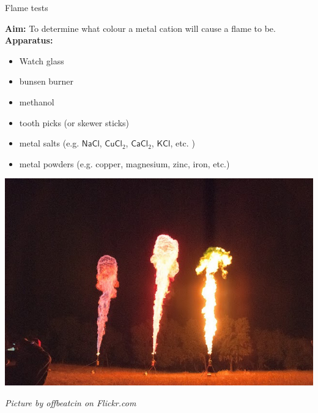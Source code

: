 \begin{i_experiment}{Flame tests}{
            \nopagebreak
            \label{m38741*eip-699}\noindent{}\textbf{Aim:}\newline
    To determine what colour a metal cation will cause a flame to be. \\
\label{m38741*eip-6991}\noindent{}\textbf{Apparatus:}\newline
\begin{minipage}{.5\textwidth}
\begin{itemize}
\item Watch glass
\item bunsen burner
\item methanol
\item tooth picks (or skewer sticks)
\item metal salts (e.g. $\mathsf{NaCl}$, ${\mathsf{CuCl}}_{2}$, ${\mathsf{CaCl}}_{2}$, $\mathsf{KCl}$, etc. )
\item metal powders (e.g. copper, magnesium, zinc, iron, etc.)
\end{itemize}
\end{minipage}
\begin{minipage}{.5\textwidth}
\begin{center}
 \includegraphics[width=.8\textwidth]{photos/offbeatcin.jpg}\par
\textit{Picture by offbeatcin on Flickr.com}
\end{center}
\end{minipage}


}
\end{i_experiment}
